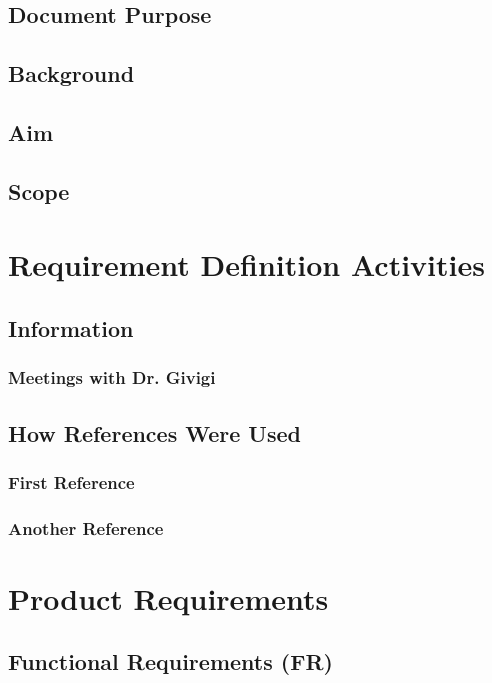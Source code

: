 \documentclass[]{report}
\begin{document}
\section{Document Purpose}

\section{Background}

\section{Aim}

\section{Scope}

\chapter{Requirement Definition Activities}

\section{Information}

\subsection{Meetings with Dr. Givigi}

\section{How References Were Used}

\subsection{First Reference}

\subsection{Another Reference}

\chapter{Product Requirements}

\section{Functional Requirements (FR)}
\end{document}
